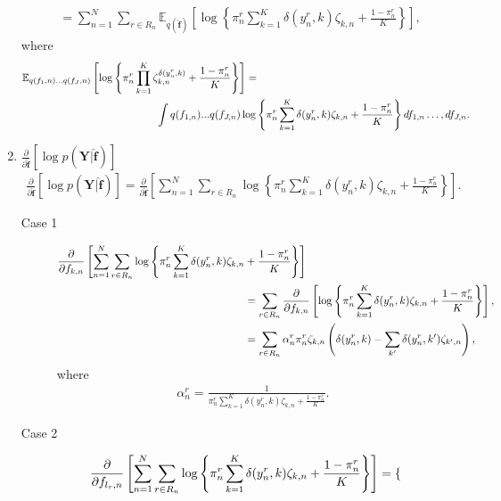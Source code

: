 \documentclass[9pt]{article}
\providecommand{\ve}[1]{{\bm{#1}}}%
\providecommand{\mat}[1]{{\bm{#1}}} %
\providecommand{\ve}[1]{{\mathbf{#1}}}
\providecommand{\mat}[1]{{\mathbf{#1}}}
\newcommand{\fracpartial}[2]{\frac{\partial #1}{\partial  #2}} %
\begin{document}
\begin{enumerate}
\begin{align}
	&= \sum_{n=1}^{N}\sum_{r\in R_n} \mathbb{E}_{q(\hat{\ve{f}})}\left[\log\left\{\pi_n^r\sum_{k=1}^{K}\delta(y_n^r,k)\zeta_{k,n} + \frac{1-\pi_n^r}{K}  \right\}\right],
	\end{align}
	where 
	\begin{align}
	\mathbb{E}_{q(f_1,n)\dots \notag q(f_J,n)}\left[\log\left\{\pi_n^r\prod_{k=1}^{K}\zeta_{k,n}^{\delta(y_n^r,k)} + \frac{1-\pi_n^r}{K}  \right\}\right]&=\\
	&\hspace{-3cm}\int q(f_{1,n})...q(f_{J,n}) \log\left\{\pi_n^r\sum_{k=1}^{K}\delta(y_n^r,k)\zeta_{k,n} + \frac{1-\pi_n^r}{K}  \right\}df_{1,n}\dots,df_{J,n}.
	\label{eq:1}
	\end{align}
	
	
	\item $\fracpartial{}{\hat{\ve{f}}}\left[\log p(\mat{Y}|\hat{\ve{f}})\right]$
	\begin{align}
	\fracpartial{}{\hat{\ve{f}}}\left[\log p(\mat{Y}|\hat{\ve{f}})\right] = \fracpartial{}{\hat{\ve{f}}}\left[\sum^N_{n=1}\sum_{r\in R_n}\log\left\{\pi_n^r\sum_{k=1}^{K}\delta(y_n^r,k)\zeta_{k,n} + \frac{1-\pi_n^r}{K}  \right\}\right].
	\end{align}
	\begin{description}
		\item[Case 1]
		\begin{align}
		\notag\fracpartial{}{f_{k,n}}\left[\sum^N_{n=1}\sum_{r\in R_n}\log\left\{\pi_n^r\sum_{k=1}^{K}\delta(y_n^r,k)\zeta_{k,n} + \frac{1-\pi_n^r}{K}  \right\}\right]\\
		\notag &\hspace{-2.0cm}=\sum_{r\in R_n}\fracpartial{}{f_{k,n}}\left[\log\left\{\pi_n^r\sum_{k=1}^{K}\delta(y_n^r,k)\zeta_{k,n} + \frac{1-\pi_n^r}{K}  \right\}\right],\\
		&\hspace{-2.0cm}=\sum_{r\in R_n}\alpha_n^r\pi_n^r\zeta_{k,n}\left(\delta(y_n^r,k)-\sum_{k^{\prime}}\delta(y_n^r,k^{\prime})\zeta_{k^{\prime},n}\right),
		\end{align}
		where 
		\begin{align}
		    \alpha_n^r = \frac{1}{\displaystyle \pi_n^r\sum_{k=1}^{K}\delta(y_n^r,k)\zeta_{k,n} + \frac{1-\pi_n^r}{K} }.
		\end{align}
		\item[Case 2]
		\begin{align}
		\notag\fracpartial{}{f_{l_r,n}}\left[\sum^N_{n=1}\sum_{r\in R_n}\log\left\{\pi_n^r\sum_{k=1}^{K}\delta(y_n^r,k)\zeta_{k,n} + \frac{1-\pi_n^r}{K}  \right\}\right]	& = \begin{cases}

\end{cases}
\end{align}
\end{description}
\end{enumerate}
\end{document}
